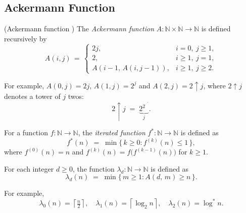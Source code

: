\documentclass[11pt]{article}
\theoremstyle{named}
\begin{document}
\subsection{Ackermann Function}

\begin{definition}
\label{def:acker}
(Ackermann function \cite{Tar75, DDP+83})
The \emph{Ackermann function} $A : \mathbb{N} \times \mathbb{N} \to \mathbb{N}$ is defined recursively by
\begin{equation}
A(i, j) \,=\,
\begin{cases}
    2j,                   & i = 0,\ j \ge 1,   \\
    2,                    & i \ge 1,\ j = 1,   \\
    A(i-1,\, A(i, j-1)), & i \ge 1,\ j \ge 2.
\end{cases}
\end{equation}
\end{definition}

For example, $A(0, j) = 2j$, $A(1, j) = 2^j$ and $A(2, j) = 2\uparrow j$, where $2\uparrow j$ denotes a tower of $j$ twos:
\begin{equation*}
2\uparrow j \;=\; \underbrace{2^{2^{\cdot^{\cdot^{\cdot^{2}}}}}}_{j}.
\end{equation*}

\begin{definition} \cite{RS03}
\label{def:iter}
For a function $f : \mathbb{N} \to \mathbb{N}$, the \emph{iterated function}
$f^* : \mathbb{N} \to \mathbb{N}$ is defined as
\begin{equation}
    f^*(n) \;=\; \min\bigl\{\, k \ge 0 : f^{(k)}(n) \le 1 \,\bigr\},
\end{equation}
where $f^{(0)}(n) = n$ and $f^{(k)}(n) = f\bigl(f^{(k-1)}(n)\bigr)$
for $k \ge 1$.
\end{definition}

\begin{definition}
\label{def:inv-acker} For each integer $d \ge 0$, the function $\lambda_d : \mathbb{N} \to \mathbb{N}$
is defined as
\begin{equation}
    \lambda_d(n) \;=\; \min\bigl\{\, m \ge 1 : A(d,\, m) \ge n \,\bigr\}.
\end{equation}
\end{definition}

For example, \[
\lambda_0(n)=\left\lceil \tfrac{n}{2} \right\rceil,\quad
\lambda_1(n)=\left\lceil \log_2 n \right\rceil,\quad
\lambda_2(n)=\log^* n.
\]
\end{document}
